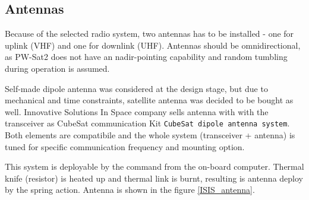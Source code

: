 \subsection{Antennas}
Because of the selected radio system, two antennas has to be installed - one for uplink (VHF) and one for downlink (UHF). Antennas should be omnidirectional, as PW-Sat2 does not have an nadir-pointing capability and random tumbling during operation is assumed.

Self-made dipole antenna was considered at the design stage, but due to mechanical and time constraints, satellite antenna was decided to be bought as well. Innovative Solutions In Space company sells antenna with with the transceiver as CubeSat communication Kit \texttt{CubeSat dipole antenna system}. Both elements are compatibile and the whole system (transceiver + antenna) is tuned for specific communication frequency and mounting option.

This system is deployable by the command from the on-board computer. Thermal knife (resistor) is heated up and thermal link is burnt, resulting is antenna deploy by the spring action. Antenna is shown in the figure \ref{ISIS_antenna}.

